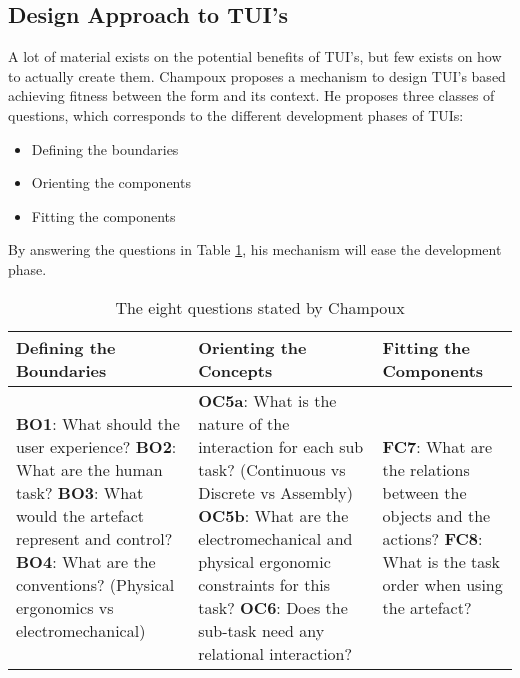 \subsection{Design Approach to TUI's}
A lot of material exists on the potential benefits of TUI's, but few exists on how to actually create them. Champoux proposes a mechanism to design TUI's based achieving fitness between the form and its context\cite{subramaniandesign}.
He proposes three classes of questions, which corresponds to the different development phases of TUIs:
\begin{itemize}
  \item Defining the boundaries
  \item Orienting the components
  \item Fitting the components
\end{itemize} 


By answering the questions in Table \ref{tab:tuidesign}, his mechanism will ease the development phase.   


\begin{table}[h]
	\begin{tabular}{| p{5.0cm} | p{5.0cm} | p{5.0cm} |}
	\hline
	\textbf{Defining the Boundaries} & \textbf{Orienting the Concepts} & \textbf{Fitting the Components} \\
	\hline
	\textbf{BO1}: What should the user experience? \newline
	\textbf{BO2}: What are the human task? \newline
	\textbf{BO3}: What would the artefact represent and control? \newline 
	\textbf{BO4}: What are the conventions? (Physical ergonomics vs electromechanical) \newline 
	&
	\textbf{OC5a}: What is the nature of the interaction for each sub task? (Continuous vs Discrete vs Assembly) \newline
	\textbf{OC5b}: What are the electromechanical and physical ergonomic constraints for this task? \newline
	\textbf{OC6}: Does the sub-task need any relational interaction? \newline
	&
	\textbf{FC7}: What are the relations between the objects and the actions? \newline 
	\textbf{FC8}: What is the task order when using the artefact? \\ 
	\hline
	
	\end{tabular}
	\caption{The eight questions stated by Champoux\cite{subramaniandesign}}
	\label{tab:tuidesign}
\end{table}  


